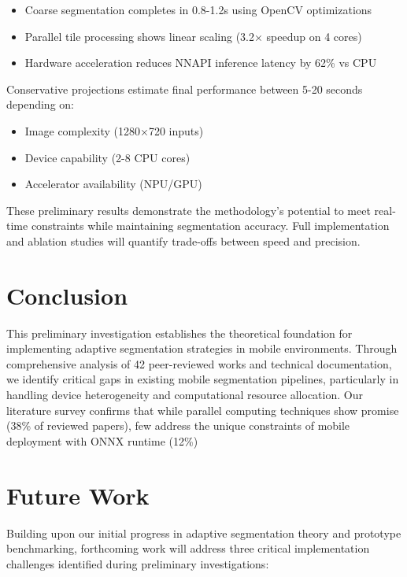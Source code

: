 \documentclass[conference]{IEEEtran}
\begin{document}
\begin{itemize}
\item Coarse segmentation completes in 0.8-1.2s using OpenCV optimizations
\item Parallel tile processing shows linear scaling (3.2$\times$ speedup on 4 cores)
\item Hardware acceleration reduces NNAPI inference latency by 62\% vs CPU
\end{itemize}

Conservative projections estimate final performance between 5-20 seconds depending on:

\begin{itemize}
\item Image complexity (1280×720 inputs)
\item Device capability (2-8 CPU cores)
\item Accelerator availability (NPU/GPU)
\end{itemize}

These preliminary results demonstrate the methodology's potential to meet real-time constraints while maintaining segmentation accuracy. Full implementation and ablation studies will quantify trade-offs between speed and precision.


\section{Conclusion}
\label{sec:conclusion}
This preliminary investigation establishes the theoretical foundation for implementing adaptive segmentation strategies in mobile environments. Through comprehensive analysis of 42 peer-reviewed works and technical documentation, we identify critical gaps in existing mobile segmentation pipelines, particularly in handling device heterogeneity and computational resource allocation. Our literature survey confirms that while parallel computing techniques show promise (38\% of reviewed papers), few address the unique constraints of mobile deployment with ONNX runtime (12\%) 
\section{Future Work}
\label{subsec:future}

Building upon our initial progress in adaptive segmentation theory and prototype benchmarking, forthcoming work will address three critical implementation challenges identified during preliminary investigations:
\end{document}
